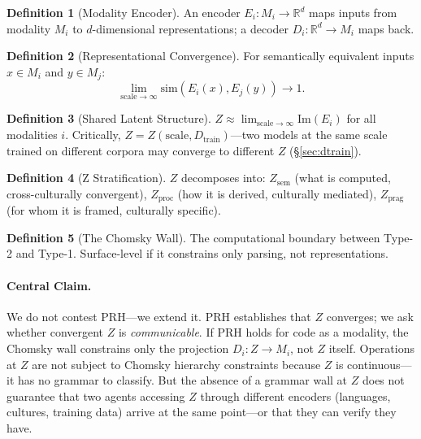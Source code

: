 \documentclass{article}
\theoremstyle{definition}
\newtheorem{definition}{Definition}[section]
\newcommand{\Zsem}{Z_{\text{sem}}}
\newcommand{\Zproc}{Z_{\text{proc}}}
\newcommand{\Zprag}{Z_{\text{prag}}}
\newcommand{\Dtrain}{D_{\text{train}}}
\begin{document}
\begin{definition}[Modality Encoder]\label{def:encoder}
An encoder $E_i : M_i \to \mathbb{R}^d$ maps inputs from modality $M_i$ to $d$-dimensional representations; a decoder $D_i : \mathbb{R}^d \to M_i$ maps back.
\end{definition}

\begin{definition}[Representational Convergence]\label{def:convergence}
For semantically equivalent inputs $x \in M_i$ and $y \in M_j$:
\[
\lim_{\text{scale}\to\infty} \mathrm{sim}(E_i(x), E_j(y)) \to 1.
\]
\end{definition}

\begin{definition}[Shared Latent Structure]\label{def:Z}
$Z \approx \lim_{\text{scale}\to\infty} \mathrm{Im}(E_i)$ for all modalities $i$. Critically, $Z = Z(\text{scale}, \Dtrain)$---two models at the same scale trained on different corpora may converge to different $Z$ (\S\ref{sec:dtrain}).
\end{definition}

\begin{definition}[Z Stratification]\label{def:stratification}
$Z$ decomposes into: $\Zsem$ (what is computed, cross-culturally convergent), $\Zproc$ (how it is derived, culturally mediated), $\Zprag$ (for whom it is framed, culturally specific).
\end{definition}

\begin{definition}[The Chomsky Wall]\label{def:wall}
The computational boundary between Type-2 and Type-1. Surface-level if it constrains only parsing, not representations.
\end{definition}

\paragraph{Central Claim.}
We do not contest PRH---we extend it. PRH establishes that $Z$ converges; we ask whether convergent $Z$ is \emph{communicable}. If PRH holds for code as a modality, the Chomsky wall constrains only the projection $D_i : Z \to M_i$, not $Z$ itself. Operations at $Z$ are not subject to Chomsky hierarchy constraints because $Z$ is continuous---it has no grammar to classify. But the absence of a grammar wall at $Z$ does not guarantee that two agents accessing $Z$ through different encoders (languages, cultures, training data) arrive at the same point---or that they can verify they have.
\end{document}

